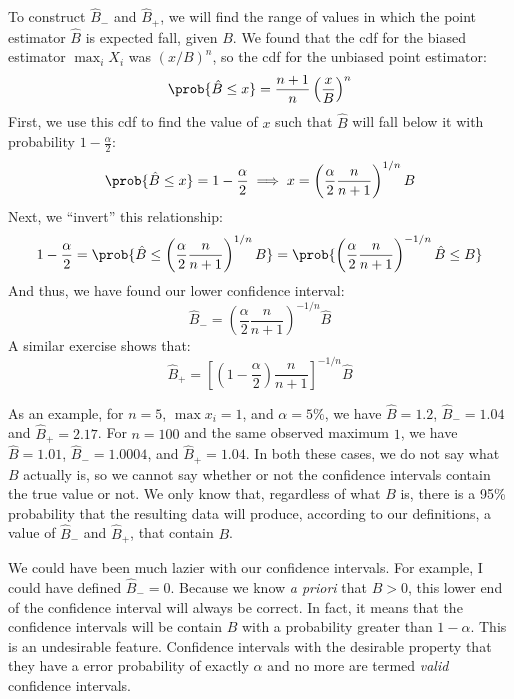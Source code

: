 To construct $\hat{B}_-$ and $\hat{B}_+$, we will find the range of values in which the point
estimator $\hat{B}$ is expected fall, given $B$. We found that the cdf for the biased
estimator $\max_i X_i$ was $(x/B)^n$, so the cdf for the
unbiased point estimator:
\begin{equation*}
    \prob{\hat{B} \leq x} = \frac{n+1}{n} \left(\frac{x}{B}\right)^n
\end{equation*}
First, we use this cdf to find the value of $x$ such that $\hat{B}$ will fall below it
with probability $1-\frac{\alpha}{2}$:
\begin{equation*}
    \prob{\hat{B} \leq x} = 1 - \frac{\alpha}{2} \implies x = \left( \frac{\alpha}{2} \frac{n}{n+1}\right)^{1/n} B
\end{equation*}
Next, we ``invert'' this relationship:
\begin{equation*}
    1 - \frac{\alpha}{2}
    = \prob{\hat{B} \leq \left( \frac{\alpha}{2} \frac{n}{n+1}\right)^{1/n} B}
    = \prob{\left( \frac{\alpha}{2} \frac{n}{n+1}\right)^{-1/n} \hat{B} \leq B}
\end{equation*}
And thus, we have found our lower confidence interval:
\begin{equation*}
    \hat{B}_- = \left( \frac{\alpha}{2} \frac{n}{n+1}\right)^{-1/n} \hat{B}
\end{equation*}
A similar exercise shows that:
\begin{equation*}
    \hat{B}_+ = \left[ \left(1- \frac{\alpha}{2}\right) \frac{n}{n+1}\right]^{-1/n} \hat{B}
\end{equation*}

As an example, for $n=5$, $\max x_i = 1$, and $\alpha = 5\%$, we have $\hat{B} = 1.2$, $\hat{B}_- = 1.04$ and $\hat{B}_+ = 2.17$. For $n=100$ and the same observed maximum $1$,
we have $\hat{B} = 1.01$,
$\hat{B}_- = 1.0004$, and $\hat{B}_+ = 1.04$. In both these cases, we do not say what $B$
actually is, so we cannot say whether or not the confidence intervals contain the true value
or not. We only know that, regardless of what $B$ is, there is a 95\% probability that the
resulting data will produce, according to our definitions, a value of $\hat{B}_-$ and
$\hat{B}_+$, that contain $B$.

We could have been much lazier with our confidence intervals. For example, I could have
defined $\hat{B}_- = 0$. Because we know \textit{a priori} that $B>0$, this lower end
of the confidence interval will always be correct. In fact, it means that the confidence
intervals will be contain $B$ with a probability greater than $1-\alpha$. This is an
undesirable feature. Confidence intervals with the desirable property that they have a
error probability of exactly $\alpha$ and no more are termed \emph{valid} confidence intervals.

